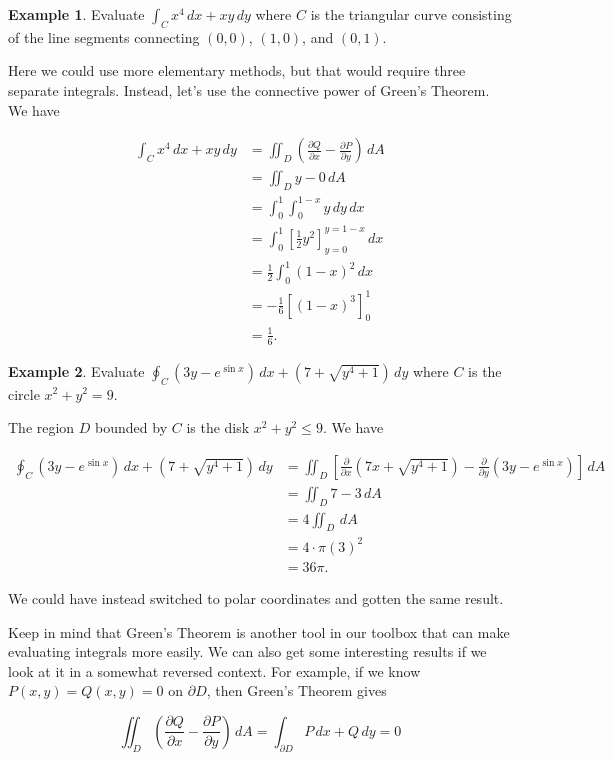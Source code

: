 \documentclass[11pt,oneside,english]{amsart}
\theoremstyle{definition}
\newtheorem*{example}{Example}
\newcommand{\pp}[2]{\frac{\partial{#1}}{\partial{#2}}}
\begin{document}
\pagebreak

\begin{example}
Evaluate $\int_Cx^4\,dx+xy\,dy$ where $C$ is the triangular curve consisting of the line segments connecting $(0,0)$, $(1,0)$, and $(0,1)$.

Here we could use more elementary methods, but that would require three separate integrals. Instead, let's use the connective power of Green's Theorem. We have

\begin{align*}
\int_Cx^4\,dx+xy\,dy&=\iint_D\left(\pp{Q}{x}-\pp{P}{y}\right)\,dA\\[2mm]
&=\iint_Dy-0\,dA\\[2mm]
&=\int_0^1\int_0^{1-x}y\,dy\,dx\\[2mm]
&=\int_0^1\left[\frac{1}{2}y^2\right]_{y=0}^{y=1-x}\,dx\\[2mm]
&=\frac{1}{2}\int_0^1(1-x)^2\,dx\\[2mm]
&=-\frac{1}{6}\left[(1-x)^3\right]_0^1\\[2mm]
&=\frac{1}{6}.
\end{align*}
\end{example}

\begin{example}
Evaluate $\oint_C(3y-e^{\sin x})\,dx+(7+\sqrt{y^4+1})\,dy$ where $C$ is the circle $x^2+y^2=9$.

The region $D$ bounded by $C$ is the disk $x^2+y^2\leq 9$. We have

\begin{align*}
\oint_C(3y-e^{\sin x})\,dx+(7+\sqrt{y^4+1})\,dy&=\iint_D\left[\pp{}{x}(7x+\sqrt{y^4+1})-\pp{}{y}(3y-e^{\sin x})\right]\,dA\\[2mm]
&=\iint_D7-3\,dA\\[2mm]
&=4\iint_D\,dA\\[2mm]
&=4\cdot\pi(3)^2\\[2mm]
&=36\pi.
\end{align*}

We could have instead switched to polar coordinates and gotten the same result.
\end{example}


Keep in mind that Green's Theorem is another tool in our toolbox that can make evaluating integrals more easily. We can also get some interesting results if we look at it in a somewhat reversed context. For example, if we know $P(x,y)=Q(x,y)=0$ on $\partial D$, then Green's Theorem gives

\[
\iint_D\left(\pp{Q}{x}-\pp{P}{y}\right)\,dA=\int_{\partial D}P\,dx+Q\,dy=0
\]
\end{document}
